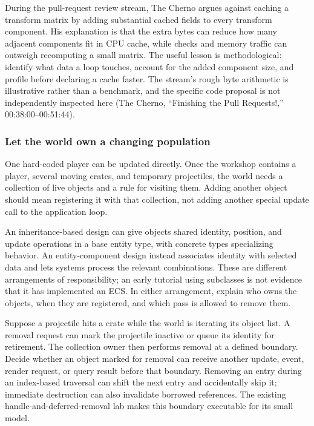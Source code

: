 During the pull-request review stream, The Cherno argues against caching a transform matrix by adding substantial cached fields to every transform component. His explanation is that the extra bytes can reduce how many adjacent components fit in CPU cache, while checks and memory traffic can outweigh recomputing a small matrix. The useful lesson is methodological: identify what data a loop touches, account for the added component size, and profile before declaring a cache faster. The stream's rough byte arithmetic is illustrative rather than a benchmark, and the specific code proposal is not independently inspected here (The Cherno, ``Finishing the Pull Requests!,'' 00:38:00--00:51:44).

\subsubsection{Let the world own a changing population}\label{06-engine-ii-ch031-let-the-world-own-a-changing-population}

One hard-coded player can be updated directly. Once the workshop contains a player, several moving crates, and temporary projectiles, the world needs a collection of live objects and a rule for visiting them. Adding another object should mean registering it with that collection, not adding another special update call to the application loop.

An inheritance-based design can give objects shared identity, position, and update operations in a base entity type, with concrete types specializing behavior. An entity-component design instead associates identity with selected data and lets systems process the relevant combinations. These are different arrangements of responsibility; an early tutorial using subclasses is not evidence that it has implemented an ECS. In either arrangement, explain who owns the objects, when they are registered, and which pass is allowed to remove them.

Suppose a projectile hits a crate while the world is iterating its object list. A removal request can mark the projectile inactive or queue its identity for retirement. The collection owner then performs removal at a defined boundary. Decide whether an object marked for removal can receive another update, event, render request, or query result before that boundary. Removing an entry during an index-based traversal can shift the next entry and accidentally skip it; immediate destruction can also invalidate borrowed references. The existing handle-and-deferred-removal lab makes this boundary executable for its small model.

